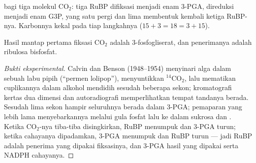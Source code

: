 \begin{omfigure}

{\small {} bagi tiga molekul $\mathrm{CO_2}$: tiga RuBP
difiksasi menjadi enam 3-PGA, direduksi menjadi enam G3P, yang satu
pergi dan lima membentuk kembali ketiga RuBP-nya. Karbonnya kekal pada
tiap langkahnya
($15 + 3 = 18 = 3 + 15$).}
\end{omfigure}

\begin{proposition}\label{prop:b1:photosynthesis:calvin}
Hasil mantap pertama fiksasi $\mathrm{CO_2}$ adalah 3-fosfogliserat,
dan penerimanya adalah ribulosa bisfosfat.
\end{proposition}
\begin{proof}[Bukti eksperimental]
Calvin dan Benson (1948--1954) menyinari alga dalam sebuah labu pipih
(``permen lolipop''), menyuntikkan $\mathrm{^{14}CO_2}$, lalu mematikan
cuplikannya dalam alkohol mendidih sesudah beberapa sekon; kromatografi
kertas dua dimensi dan autoradiografi memperlihatkan tempat tandanya
berada. Sesudah lima sekon hampir seluruhnya berada dalam 3-PGA;
pemaparan yang lebih lama menyebarkannya melalui gula fosfat lalu ke
dalam sukrosa dan . Ketika $\mathrm{CO_2}$-nya tiba-tiba
disingkirkan, RuBP menumpuk dan 3-PGA turun; ketika cahayanya
dipadamkan, 3-PGA menumpuk dan RuBP turun --- jadi RuBP adalah
penerima yang dipakai fiksasinya, dan 3-PGA hasil yang dipakai  serta
NADPH cahayanya.
\end{proof}

